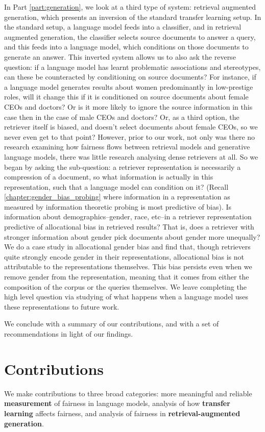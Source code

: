 In Part \ref{part:generation}, we look at a third type of system: retrieval augmented generation, which presents an inversion of the standard transfer learning setup. In the standard setup,  a language model feeds into a classifier, and in retrieval augmented generation, the classifier selects source documents to answer a query, and this feeds into a language model, which conditions on those documents to generate an answer. This inverted system allows us to also ask the reverse question: if a language model has learnt problematic associations and stereotypes, can these be counteracted by conditioning on source documents? For instance, if a language model generates results about women predominantly in low-prestige roles, will it change this if it is conditioned on source documents about female CEOs and doctors? Or is it more likely to ignore the source information in this case then in the case of male CEOs and doctors? Or, as a third option, the retriever itself is biased, and doesn't select documents about female CEOs, so we never even get to that point?
However, prior to our work, not only was there no research examining how fairness flows between retrieval models and generative language models, there was little research analysing dense retrievers at all. So we began by asking the sub-question: a retriever representation is necessarily a compression of a document, so what information is actually in this representation, such that 
 a language model can condition on it? (Recall \ref{chapter:gender_bias_probing} where information in a representation as measured by information theoretic probing is most predictive of bias). Is information about demographics--gender, race, etc--in a retriever representation predictive of allocational bias in retrieved results? That is, does a retriever with stronger information about gender pick documents about gender more unequally? We do a case study in allocational gender bias and find that, though retrievers quite strongly encode gender in their representations, allocational bias is not attributable to the representations themselves. This bias persists even when we remove gender from the representation, meaning that it comes from either the composition of the corpus or the queries themselves. We leave completing the high level question via studying of what happens when a language model uses these representations to future work. 

 We conclude with a summary of our contributions, and with a set of recommendations in light of our findings.

\section{Contributions}
We make contributions to three broad categories: more meaningful and reliable \textbf{measurement} of fairness in language models, analysis of how \textbf{transfer learning} affects fairness, and analysis of fairness in \textbf{retrieval-augmented generation}.


